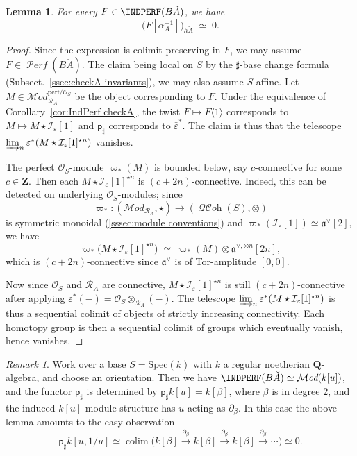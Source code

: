 \documentclass[12pt, oneside]{amsart}
\numberwithin{equation}{section}
\newtheorem{lemma}[subsubsection]{Lemma}
\theoremstyle{remark}
\newtheorem{remark}[subsubsection]{Remark}
\theoremstyle{plain}
\newcommand{\MOD}{\mathcal{M}\textit{od}}
\DeclareMathOperator{\QCOH}{\mathcal{QC}\textit{oh}}
\DeclareMathOperator{\PERF}{\mathcal{P}\textit{erf}}
\newcommand{\R}{\mathcal{R}}
\newcommand{\RA}{\R_A}
\newcommand{\fra}{\mathfrak{a}}
\newcommand{\frav}{\mathfrak{a}^\vee}
\newcommand{\OO}{\mathcal{O}}
\newcommand{\bZ}{\mathbf{Z}}
\newcommand{\Thom}[1]{\langle #1 \rangle}
\newcommand{\eps}{\varepsilon}
\newcommand{\epsb}{\bar{\varepsilon}}
\newcommand{\sfp}{\mathsf{p}}
\begin{document}
\begin{lemma}\label{lem:coinv kill periodization}
  For every $F \in \INDPERF(B\check{A})$, we have
  \[
    \bigl( F[\alpha_A^{-1}] \bigr)_{h\check{A}} \;\simeq\; 0.
  \]
\end{lemma}
\begin{proof}
  Since the expression is colimit-preserving in $F$, we may assume $F \in \PERF(B\check{A})$.
  The claim being local on $S$ by the $\sharp$-base change formula (Subsect.~\ref{ssec:checkA invariants}), we may also assume $S$ affine.
  Let $M \in \MOD_{\RA}^{\mathrm{perf}/\OO_S}$ be the object corresponding to $F$.
  Under the equivalence of Corollary~\ref{cor:IndPerf checkA}, the twist $F \mapsto F\Thom{1}$ corresponds to $M \mapsto M \star \mathcal{I}_{\eps}[1]$ and $\sfp_\sharp$ corresponds to $\epsb^*$.
  The claim is thus that the telescope $\varinjlim_n \epsb^*(M \star \mathcal{I}_\eps[1]^{\star n})$ vanishes.

  The perfect $\OO_S$-module $\varpi_*(M)$ is bounded below, say $c$-connective for some $c \in \bZ$.
  Then each $M \star \mathcal{I}_\eps[1]^{\star n}$ is $(c+2n)$-connective.
  Indeed, this can be detected on underlying $\OO_S$-modules; since $$\varpi_* : (\MOD_{\RA}, \star) \to (\QCOH(S), \otimes)$$ is symmetric monoidal (\ref{sssec:module conventions}) and $\varpi_*(\mathcal{I}_\eps[1]) \simeq \frav[2]$, we have
  \[
    \varpi_*\bigl( M \star \mathcal{I}_\eps[1]^{\star n} \bigr)
    \;\simeq\;
    \varpi_*(M) \otimes \fra^{\vee, \otimes n}[2n],
  \]
  which is $(c+2n)$-connective since $\frav$ is of Tor-amplitude $[0,0]$.

  Now since $\OO_S$ and $\RA$ are connective, $M \star \mathcal{I}_\eps[1]^{\star n}$ is still $(c+2n)$-connective after applying $\eps^*(-) = \OO_S \otimes_{\RA} (-)$.
  The telescope $\varinjlim_n \epsb^*(M \star \mathcal{I}_\eps[1]^{\star n})$ is thus a sequential colimit of objects of strictly increasing connectivity.
  Each homotopy group is then a sequential colimit of groups which eventually vanish, hence vanishes.
\end{proof}

\begin{remark} Work over a base $S=\text{Spec}(k)$ with $k$ a regular noetherian $\mathbf{Q}$-algebra, and choose an orientation. Then we have $\INDPERF(B\check{A})\simeq \MOD(k[u])$, and the functor $\sfp_\sharp$ is determined by $\sfp_\sharp k[u]=k[\beta]$, where $\beta$ is in degree $2$, and the induced $k[u]$-module structure has $u$ acting as $\partial_\beta$. In this case the above lemma amounts to the easy observation $$\sfp_\sharp k[u,1/u]\simeq \operatorname{colim}\Big( k[\beta]\xrightarrow{\partial_\beta} k[\beta]\xrightarrow{\partial_\beta}k[\beta]\xrightarrow{\partial_\beta}\cdots\Big)\simeq 0.$$\end{remark}
\end{document}

